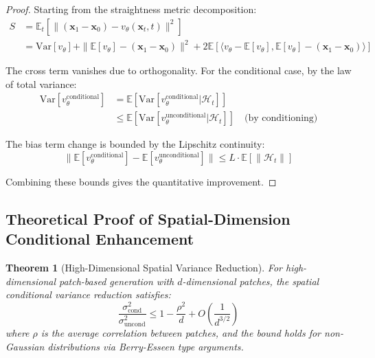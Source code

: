 \documentclass{article}
\theoremstyle{plain}
\newtheorem{theorem}{Theorem}[section]
\theoremstyle{definition}
\theoremstyle{remark}
\newcommand{\vx}{\mathbf{x}}
\begin{document}
\begin{proof}
Starting from the straightness metric decomposition:
\begin{align}
S &= \mathbb{E}_t\left[\|(\vx_1 - \vx_0) - v_\theta(\vx_t,t)\|^2\right] \\
&= \text{Var}[v_\theta] + \|\mathbb{E}[v_\theta] - (\vx_1 - \vx_0)\|^2 + 2\mathbb{E}[\langle v_\theta - \mathbb{E}[v_\theta], \mathbb{E}[v_\theta] - (\vx_1 - \vx_0)\rangle]
\end{align}

The cross term vanishes due to orthogonality. For the conditional case, by the law of total variance:
\begin{align}
\text{Var}[v_\theta^{\text{conditional}}] &= \mathbb{E}[\text{Var}[v_\theta^{\text{conditional}}|\mathcal{H}_t]] \\
&\leq \mathbb{E}[\text{Var}[v_\theta^{\text{unconditional}}|\mathcal{H}_t]] \quad \text{(by conditioning)}
\end{align}

The bias term change is bounded by the Lipschitz continuity:
\begin{equation}
\|\mathbb{E}[v_\theta^{\text{conditional}}] - \mathbb{E}[v_\theta^{\text{unconditional}}]\| \leq L \cdot \mathbb{E}[\|\mathcal{H}_t\|]
\end{equation}

Combining these bounds gives the quantitative improvement.
\end{proof}

\subsection{Theoretical Proof of Spatial-Dimension Conditional Enhancement}

\begin{theorem}[High-Dimensional Spatial Variance Reduction]
\label{thm:high_dim_spatial}
For high-dimensional patch-based generation with $d$-dimensional patches, the spatial conditional variance reduction satisfies:
\begin{equation}
\frac{\sigma_{\text{cond}}^2}{\sigma_{\text{uncond}}^2} \leq 1 - \frac{\rho^2}{d} + O\left(\frac{1}{d^{3/2}}\right)
\end{equation}
where $\rho$ is the average correlation between patches, and the bound holds for non-Gaussian distributions via Berry-Esseen type arguments.
\end{theorem}
\end{document}
